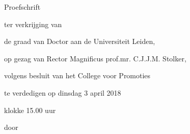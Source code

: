  \begin{titlepage}

\begin{center}








\vspace*{2\bigskipamount}

{\makeatletter
\titlestyle\bfseries\LARGE\@title
\makeatother}

{\makeatletter
\ifx\@subtitle\undefined\else
    \bigskip
    \titlefont\titleshape\Large\@subtitle
\fi
\makeatother}


\bigskip
\bigskip
\bigskip
\bigskip
\bigskip
\bigskip

{\Large\titlefont Proefschrift}

\bigskip
\bigskip

ter verkrijging van

de graad van Doctor aan de Universiteit Leiden,

op gezag van Rector Magnificus prof.mr. C.J.J.M. Stolker,

volgens besluit van het College voor Promoties

te verdedigen op dinsdag 3 april 2018

klokke 15.00 uur

\bigskip
\bigskip

door

\bigskip
\bigskip


\end{center}
\end{titlepage}
